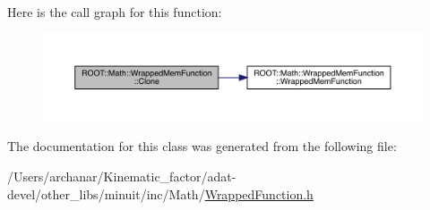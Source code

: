 Here is the call graph for this function\+:
\nopagebreak
\begin{figure}[H]
\begin{center}
\leavevmode
\includegraphics[width=350pt]{dd/df6/classROOT_1_1Math_1_1WrappedMemFunction_a6f27e92240e16003ff20c25df6fba1eb_cgraph}
\end{center}
\end{figure}


The documentation for this class was generated from the following file\+:\begin{DoxyCompactItemize}
\item 
/\+Users/archanar/\+Kinematic\+\_\+factor/adat-\/devel/other\+\_\+libs/minuit/inc/\+Math/\mbox{\hyperlink{adat-devel_2other__libs_2minuit_2inc_2Math_2WrappedFunction_8h}{Wrapped\+Function.\+h}}\end{DoxyCompactItemize}
